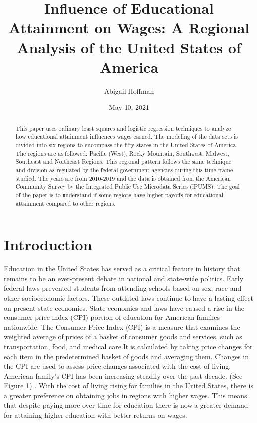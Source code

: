 \documentclass[12pt, English]{article}
\title{Influence of Educational Attainment on Wages: A Regional Analysis of the United States of America}
\author{Abigail Hoffman}
\date{May 10, 2021}
\begin{document}
\maketitle
\begin{abstract}
This paper uses ordinary least squares and logistic regression techniques to analyze how educational attainment influences wages earned. The modeling of the data sets is divided into six regions to encompass the fifty states in the United States of America. The regions are as followed: Pacific (West), Rocky Mountain, Southwest, Midwest, Southeast and Northeast Regions. This regional pattern follows the same technique and division as regulated by the federal government agencies during this time frame studied. The years are from 2010-2019 and the data is obtained from the American Community Survey by the Integrated Public Use Microdata Series (IPUMS). The goal of the paper is to understand if some regions have higher payoffs for educational attainment compared to other regions. 
\end{abstract}

\newpage

\section{Introduction}
\doublespacing
Education in the United States has served as a critical feature in history that remains to be an ever-present debate in national and state-wide politics. Early federal laws prevented students from attending schools based on sex, race and other socioeconomic factors. These outdated laws continue to have a lasting effect on present state economies. State economies and laws have caused a rise in the consumer price index (CPI) portion of education for American families nationwide. The Consumer Price Index (CPI) is a measure that examines the weighted average of prices of a basket of consumer goods and services, such as transportation, food, and medical care.It is calculated by taking price changes for each item in the predetermined basket of goods and averaging them. Changes in the CPI are used to assess price changes associated with the cost of living. American family's CPI has been increasing steadily over the past decade. (See Figure 1) \citep{USBureauofLaborStatistics}. With the cost of living rising for families in the United States, there is a greater preference on obtaining jobs in regions with higher wages. This means that despite paying more over time for education there is now a greater demand for attaining higher education with better returns on wages. 
\end{document}
